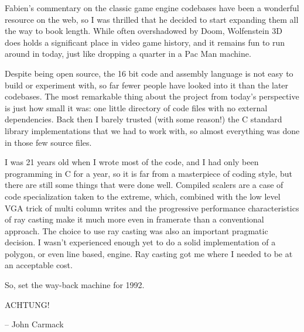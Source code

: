 Fabien's commentary on the classic game engine codebases have been a wonderful resource on the web, so I was thrilled that he decided to start expanding them all the way to book length. While often overshadowed by Doom, Wolfenstein 3D does holds a significant place in video game history, and it remains fun to run around in today, just like dropping a quarter in a Pac Man machine.\\
\par
 Despite being open source, the 16 bit code and assembly language is not easy to build or experiment with, so far fewer people have looked into it than the later codebases. The most remarkable thing about the project from today's perspective is just how small it was: one little directory of code files with no external dependencies.  Back then I barely trusted (with some reason!) the C standard library implementations that we had to work with, so almost everything was done in those few source files.\\
\par
I was 21 years old when I wrote most of the code, and I had only been programming in C for a year, so it is far from a masterpiece of coding style, but there are still some things that were done well. Compiled scalers are a case of code specialization taken to the extreme, which, combined with the low level VGA trick of multi column writes and the progressive performance characteristics of ray casting make it much more even in framerate than a conventional approach. The choice to use ray casting was also an important pragmatic decision.  I wasn't experienced enough yet to do a solid implementation of a polygon, or even line based, engine.  Ray casting got me where I needed to be at an acceptable cost.\\
\par 
So, set the way-back machine for 1992.\\
\par
ACHTUNG!\\
\par
-- John Carmack
